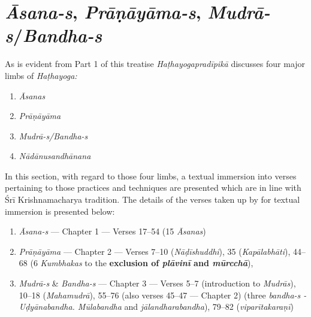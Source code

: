 \part{\textit{Āsana-s}, \textit{Prāṇāyāma-s}, \textit{Mudrā-s}/\textit{Bandha-s}}


As is evident from Part 1 of this treatise \textit{Haṭhayogapradīpikā} discusses four major limbs of \textit{Haṭhayoga:} 
\begin{enumerate}
\itemsep=0pt
\renewcommand{\theenumi}{\alph{enumi}}
\renewcommand{\labelenumi}{\theenumi)}
\item \textit{Āsanas}
\item \textit{Prāṇāyāma}
\item \textit{Mudrā-s/Bandha-s} 
\item \textit{Nādānusandhānana}
\end{enumerate}

In this section, with regard to those four limbs, a textual immersion into verses pertaining to those practices and techniques are presented which are in line with Śrī Krishnamacharya tradition. The details of the verses taken up by for textual immersion is presented below:

\begin{enumerate}
\itemsep=0pt
\item \textit{Āsana-s} --- Chapter 1 --- Verses 17--54 (15 \textit{Āsanas})
\item \textit{Prāṇāyāma} --- Chapter 2 ---  Verses 7--10 (\textit{Nāḍīshuddhi}), 35 (\textit{Kapālabhāti}), 44--68 (6 \textit{Kumbhakas} to the \textbf{exclusion of \textit{plāvinī} and \textit{mūrcchā}}), 
\item \textit{Mudrā-s} \& \textit{Bandha-s} --- Chapter 3 --- Verses 5--7 (introduction to \textit{Mudrās}), 10--18 (\textit{Mahamudrā}), 55--76 (also verses 45--47 --- Chapter 2) (three \textit{bandha-s - Uḍyānabandha. Mūlabandha} and \textit{jālandharabandha}), 79--82 (\textit{viparītakaraṇī})
\end{enumerate}



